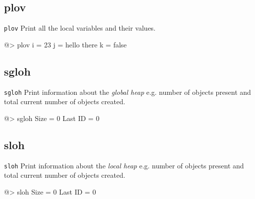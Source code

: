 \subsection*{plov}  
 
{\tt plov} 
\newline\newline 
Print all the local variables and their values.
\begin{verbatimtab} 
@> plov
i = 23
j = hello there
k = false
\end{verbatimtab} 

\subsection*{sgloh}  
 
{\tt sgloh} 
\newline\newline 
Print information about the {\it global heap} e.g. number of objects present and total current number of objects created.
\begin{verbatimtab} 
@> sgloh
Size = 0 Last ID = 0
\end{verbatimtab} 

\subsection*{sloh}  
 
{\tt sloh} 
\newline\newline 
Print information about the {\it local heap} e.g. number of objects present and total current number of objects created.
\begin{verbatimtab} 
@> sloh
Size = 0 Last ID = 0
\end{verbatimtab} 

